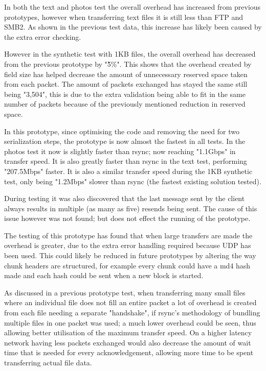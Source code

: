In both the text and photos test the overall overhead has increased from previous prototypes, however when transferring text files it is still less than FTP and SMB2. As shown in the previous test data, this increase has likely been caused by the extra error checking.

However in the synthetic test with 1KB files, the overall overhead has decreased from the previous prototype by "\~5\%". This shows that the overhead created by field size has helped decrease the amount of unnecessary reserved space taken from each packet. The amount of packets exchanged has stayed the same still being "3,504", this is due to the extra validation being able to fit in the same number of packets because of the previously mentioned reduction in reserved space.

In this prototype, since optimising the code and removing the need for two serialization steps, the prototype is now almost the fastest in all tests. In the photos test it now is slightly faster than rsync; now reaching "1.1Gbps" in transfer speed. It is also greatly faster than rsync in the text test, performing "207.5Mbps" faster. It is also a similar transfer speed during the 1KB synthetic test, only being "1.2Mbps" slower than rsync (the fastest existing solution tested).

During testing it was also discovered that the last message sent by the client always results in multiple (as many as five) resends being sent. The cause of this issue however was not found; but does not effect the running of the prototype.

The testing of this prototype has found that when large transfers are made the overhead is greater, due to the extra error handling required because UDP has been used. This could likely be reduced in future prototypes by altering the way chunk headers are structured, for example every chunk could have a md4 hash made and each hash could be sent when a new block is started.

As discussed in a previous prototype test, when transferring many small files where an individual file does not fill an entire packet a lot of overhead is created from each file needing a separate "handshake", if rsync's methodology of bundling multiple files in one packet was used; a much lower overhead could be seen, thus allowing better utilisation of the maximum transfer speed. On a higher latency network having less packets exchanged would also decrease the amount of wait time that is needed for every acknowledgement, allowing more time to be spent transferring actual file data.
